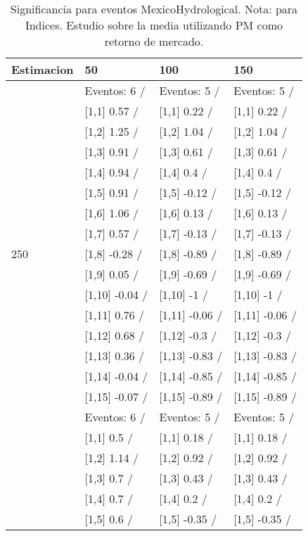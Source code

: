 \begin{table}

\caption{Significancia para eventos MexicoHydrological. Nota: para Indices. Estudio sobre la media utilizando PM como retorno de mercado.}
\centering
\begin{tabular}[t]{llll}
\toprule
Estimacion & 50 & 100 & 150\\
\midrule
 & Eventos:  6 / & Eventos:  5 / & Eventos:  5 /\\
 & {}[1,1] 0.57  / & {}[1,1] 0.22  / & {}[1,1] 0.22  /\\
 & {}[1,2] 1.25  / & {}[1,2] 1.04  / & {}[1,2] 1.04  /\\
 & {}[1,3] 0.91  / & {}[1,3] 0.61  / & {}[1,3] 0.61  /\\
 & {}[1,4] 0.94  / & {}[1,4] 0.4  / & {}[1,4] 0.4  /\\
\addlinespace
 & {}[1,5] 0.91  / & {}[1,5] -0.12  / & {}[1,5] -0.12  /\\
 & {}[1,6] 1.06  / & {}[1,6] 0.13  / & {}[1,6] 0.13  /\\
 & {}[1,7] 0.57  / & {}[1,7] -0.13  / & {}[1,7] -0.13  /\\
250 & {}[1,8] -0.28  / & {}[1,8] -0.89  / & {}[1,8] -0.89  /\\
 & {}[1,9] 0.05  / & {}[1,9] -0.69  / & {}[1,9] -0.69  /\\
\addlinespace
 & {}[1,10] -0.04  / & {}[1,10] -1  / & {}[1,10] -1  /\\
 & {}[1,11] 0.76  / & {}[1,11] -0.06  / & {}[1,11] -0.06  /\\
 & {}[1,12] 0.68  / & {}[1,12] -0.3  / & {}[1,12] -0.3  /\\
 & {}[1,13] 0.36  / & {}[1,13] -0.83  / & {}[1,13] -0.83  /\\
 & {}[1,14] -0.04  / & {}[1,14] -0.85  / & {}[1,14] -0.85  /\\
\addlinespace
 & {}[1,15] -0.07  / & {}[1,15] -0.89  / & {}[1,15] -0.89  /\\
 & Eventos:  6 / & Eventos:  5 / & Eventos:  5 /\\
 & {}[1,1] 0.5  / & {}[1,1] 0.18  / & {}[1,1] 0.18  /\\
 & {}[1,2] 1.14  / & {}[1,2] 0.92  / & {}[1,2] 0.92  /\\
 & {}[1,3] 0.7  / & {}[1,3] 0.43  / & {}[1,3] 0.43  /\\
\addlinespace
 & {}[1,4] 0.7  / & {}[1,4] 0.2  / & {}[1,4] 0.2  /\\
 & {}[1,5] 0.6  / & {}[1,5] -0.35  / & {}[1,5] -0.35  /\\

\end{tabular}
\end{table}
